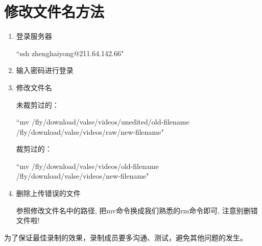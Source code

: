 \documentclass[12pt]{ctexart}
\begin{document}
\section{修改文件名方法}
\begin{enumerate}
 \item 登录服务器

``ssh zhenghaiyong@211.64.142.66"

 \item 输入密码进行登录

 \item 修改文件名

{\color{blue}未裁剪过的：}

  ``mv /fly/download/valse/videos/unedited/old-filename /fly/download/valse/videos/raw/new-filename"

{\color{blue}裁剪过的：}

  ``mv /fly/download/valse/videos/old-filename /fly/download/valse/videos/new-filename"
  
 \item 删除上传错误的文件
 
 参照修改文件名中的路径, 把mv命令换成我们熟悉的rm命令即可, 注意别删错文件啦!
\end{enumerate}





{\color{red}为了保证最佳录制的效果，录制成员要多沟通、测试，避免其他问题的发生。}
\end{document}
